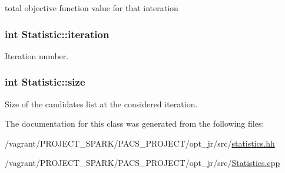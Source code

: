 total objective function value for that interation 

\hypertarget{classStatistic_a1c1a722f5e4b883fb2d24b99a9c1b554}{
\subsubsection[{iteration}]{\setlength{\rightskip}{0pt plus 5cm}int Statistic\-::iteration\hspace{0.3cm}{\ttfamily [private]}}}\label{classStatistic_a1c1a722f5e4b883fb2d24b99a9c1b554}


Iteration number. 

\hypertarget{classStatistic_ad31dd663eb3557247d0871b523d73350}{
\subsubsection[{size}]{\setlength{\rightskip}{0pt plus 5cm}int Statistic\-::size\hspace{0.3cm}{\ttfamily [private]}}}\label{classStatistic_ad31dd663eb3557247d0871b523d73350}


Size of the candidates list at the considered iteration. 



The documentation for this class was generated from the following files\-:\begin{DoxyCompactItemize}
\item 
/vagrant/\-P\-R\-O\-J\-E\-C\-T\-\_\-\-S\-P\-A\-R\-K/\-P\-A\-C\-S\-\_\-\-P\-R\-O\-J\-E\-C\-T/opt\-\_\-jr/src/\hyperlink{statistics_8hh}{statistics.\-hh}\item 
/vagrant/\-P\-R\-O\-J\-E\-C\-T\-\_\-\-S\-P\-A\-R\-K/\-P\-A\-C\-S\-\_\-\-P\-R\-O\-J\-E\-C\-T/opt\-\_\-jr/src/\hyperlink{Statistics_8cpp}{Statistics.\-cpp}\end{DoxyCompactItemize}
